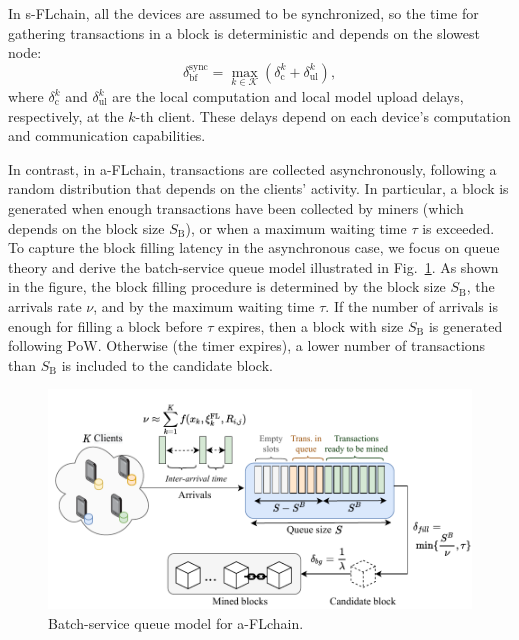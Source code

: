 \documentclass[10pt,journal,compsoc]{IEEEtran}
\begin{document}
In s-FLchain, all the devices are assumed to be synchronized, so the time for gathering transactions in a block is deterministic and depends on the slowest node:
\begin{equation}
\delta_\text{bf}^\text{sync} = \max_{k\in \mathcal{K}} (\delta_\text{c}^k + \delta_\text{ul}^k),
\end{equation}
where $\delta_\text{c}^k$ and $\delta_\text{ul}^k$ are the local computation and local model upload delays, respectively, at the $k$-th client. These delays depend on each device's computation and communication capabilities. 

In contrast, in a-FLchain, transactions are collected asynchronously, following a random distribution that depends on the clients' activity. In particular, a block is generated when enough transactions have been collected by miners (which depends on the block size $S_\text{B}$), or when a maximum waiting time $\tau$ is exceeded. To capture the block filling latency in the asynchronous case, we focus on queue theory and derive the batch-service queue model illustrated in Fig.~\ref{fig:batch_service_queue}. As shown in the figure, the block filling procedure is determined by the block size $S_\text{B}$, the arrivals rate $\nu$, and by the maximum waiting time $\tau$. If the number of arrivals is enough for filling a block before $\tau$ expires, then a block with size $S_\text{B}$ is generated following PoW. Otherwise (the timer expires), a lower number of transactions than $S_\text{B}$ is included to the candidate block. 

\begin{figure}[ht!]
	\centering
	\includegraphics[width=\linewidth]{img/batch_service_queue2.pdf}
	\caption{Batch-service queue model for a-FLchain.}
	\label{fig:batch_service_queue}
\end{figure}
\end{document}
